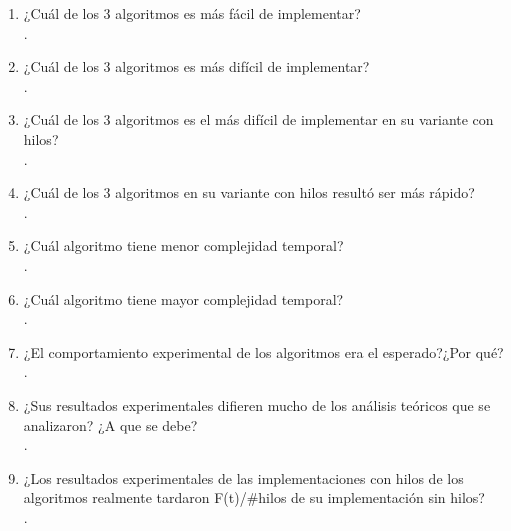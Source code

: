 \documentclass[12pt]{article}
\begin{document}
		\begin{enumerate}
			        \item ¿Cuál de los 3 algoritmos es más fácil de implementar?\\
			        .\\
			        
			        \item ¿Cuál de los 3 algoritmos es más difícil de implementar?\\
			        .\\
			        
			        \item ¿Cuál de los 3 algoritmos es el más difícil de implementar en su variante con hilos?\\
			        .\\
			        
			        \item ¿Cuál de los 3 algoritmos en su variante con hilos resultó ser más rápido?\\
			        .\\
			        
			        \item ¿Cuál algoritmo tiene menor complejidad temporal?\\
	                .\\
			        
			        \item ¿Cuál algoritmo tiene mayor complejidad temporal?\\
			        . \\
			        
			        
			        \item ¿El comportamiento experimental de los algoritmos era el esperado?¿Por qué?\\
			        .\\
			        
			        \item ¿Sus resultados experimentales difieren mucho de los análisis teóricos que se analizaron? ¿A que se debe?\\
			        .\\
			        
			        \item ¿Los resultados experimentales de las implementaciones con hilos de los algoritmos realmente tardaron F(t)/#hilos de su implementación sin hilos?\\
			        .\\
			        

\end{enumerate}
\end{document}
